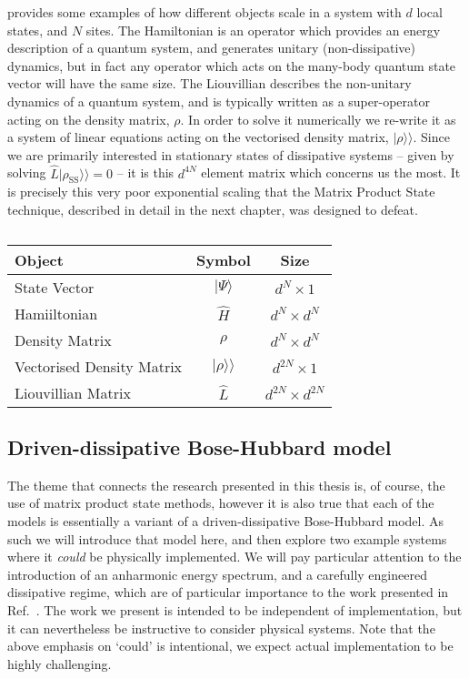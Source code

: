  provides some examples of how different objects scale in a system with \(d\) local states, and \(N\) sites. The Hamiltonian is an operator which provides an energy description of a quantum system, and generates unitary (non-dissipative) dynamics, but in fact any operator which acts on the many-body quantum state vector will have the same size. The Liouvillian describes the non-unitary dynamics of a quantum system, and is typically written as a super-operator acting on the density matrix, \(\rho\). In order to solve it numerically we re-write it as a system of linear equations acting on the vectorised density matrix, \(|\rho\rangle\rangle\). Since we are primarily interested in stationary states of dissipative systems -- given by solving \(\hat{L}|\rho_{\mathrm{SS}}\rangle\rangle = 0\) -- it is this \(d^{4N}\) element matrix which concerns us the most. It is precisely this very poor exponential scaling that the Matrix Product State technique, described in detail in the next chapter, was designed to defeat. 

\begin{table}[ht!]
	\centering
	\begin{tabu}{lcc}
		\hline
		Object & Symbol & Size \\
		\hline
		State Vector & \(|\Psi\rangle\) & \(d^{N} \times 1\) \\
		Hamiiltonian & \(\hat{H}\) & \(d^{N} \times d^{N}\) \\
		Density Matrix & \(\rho\) & \(d^{N} \times d^{N}\) \\
		Vectorised Density Matrix & \(|\rho \rangle\rangle\) & \(d^{2N} \times 1\) \\
		Liouvillian Matrix & \(\hat{L}\) & \(d^{2N} \times d^{2N}\)
	\end{tabu}
	\caption{\label{tab:mbq1-1}}
\end{table}

\FloatBarrier
\subsection{Driven-dissipative Bose-Hubbard model}
The theme that connects the research presented in this thesis is, of course, the use of matrix product state methods, however it is also true that each of the models is essentially a variant of a driven-dissipative Bose-Hubbard model. As such we will introduce that model here, and then explore two example systems where it \emph{could} be physically implemented. We will pay particular attention to the introduction of an anharmonic energy spectrum, and a carefully engineered dissipative regime, which are of particular importance to the work presented in Ref.~\cite{Brown2018}. The work we present is intended to be independent of implementation, but it can nevertheless be instructive to consider physical systems. Note that the above emphasis on `could' is intentional, we expect actual implementation to be highly challenging.

